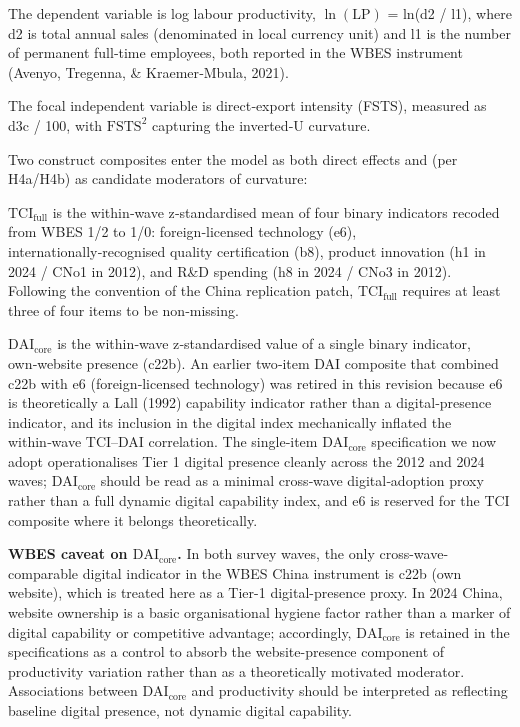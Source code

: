 \documentclass[12pt,a4paper]{article}
\begin{document}
The dependent variable is log labour productivity, \(\ln(\mathrm{LP})\)
= ln(d2 / l1), where d2 is total annual sales (denominated in local
currency unit) and l1 is the number of permanent full‑time employees,
both reported in the WBES instrument (Avenyo, Tregenna, \&
Kraemer‑Mbula, 2021).

The focal independent variable is direct‑export intensity (FSTS),
measured as d3c / 100, with \(\mathrm{FSTS}^2\) capturing the inverted‑U
curvature.

Two construct composites enter the model as both direct effects and (per
H4a/H4b) as candidate moderators of curvature:

\textbf{\(\mathrm{TCI}_{\text{full}}\)} is the within‑wave
z‑standardised mean of four binary indicators recoded from WBES 1/2 to
1/0: foreign‑licensed technology (e6), internationally‑recognised
quality certification (b8), product innovation (h1 in 2024 / CNo1 in
2012), and R\&D spending (h8 in 2024 / CNo3 in 2012). Following the
convention of the China replication patch,
\(\mathrm{TCI}_{\text{full}}\) requires at least three of four items to
be non‑missing.

\textbf{\(\mathrm{DAI}_{\text{core}}\)} is the within‑wave
z‑standardised value of a single binary indicator, own‑website presence
(c22b). An earlier two‑item DAI composite that combined c22b with e6
(foreign‑licensed technology) was retired in this revision because e6 is
theoretically a Lall (1992) capability indicator rather than a
digital‑presence indicator, and its inclusion in the digital index
mechanically inflated the within‑wave TCI--DAI correlation. The
single‑item \(\mathrm{DAI}_{\text{core}}\) specification we now adopt
operationalises Tier 1 digital presence cleanly across the 2012 and 2024
waves; \(\mathrm{DAI}_{\text{core}}\) should be read as a minimal
cross‑wave digital‑adoption proxy rather than a full dynamic digital
capability index, and e6 is reserved for the TCI composite where it
belongs theoretically.

\textbf{WBES caveat on \(\mathrm{DAI}_{\text{core}}\).} In both survey
waves, the only cross-wave-comparable digital indicator in the WBES
China instrument is c22b (own website), which is treated here as a
Tier-1 digital-presence proxy. In 2024 China, website ownership is a
basic organisational hygiene factor rather than a marker of digital
capability or competitive advantage; accordingly,
\(\mathrm{DAI}_{\text{core}}\) is retained in the specifications as a
control to absorb the website-presence component of productivity
variation rather than as a theoretically motivated moderator.
Associations between \(\mathrm{DAI}_{\text{core}}\) and productivity
should be interpreted as reflecting baseline digital presence, not
dynamic digital capability.
\end{document}
